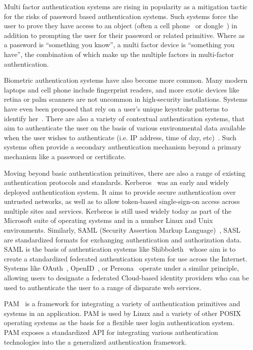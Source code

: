 Multi factor authentication systems are rising in popularity as a
mitigation tactic for the risks of password based authentication
systems. Such systems force the user to prove they have access to an
object (often a cell phone~\cite{google-auth} or
dongle~\cite{yubikey}) in addition to prompting the user for their
password or related primitive. Where as a password is ``something you
know'', a multi factor device is ``something you have'', the
combination of which make up the multiple factors in multi-factor
authentication.

Biometric authentication systems have also become more common. Many
modern laptops and cell phone include fingerprint readers, and more
exotic devices like retina or palm scanners are not uncommon in
high-security installations. Systems have even been proposed that rely
on a user's unique keystroke patterns to identify
her~\cite{Peacock2004}. There are also a variety of contextual
authentication systems, that aim to authenticate the user on the basis
of various environmental data available when the user wishes to
authenticate (i.e. IP address, time of day,
etc)~\cite{Hulsebosch2005}. Such systems often provide a secondary
authentication mechanism beyond a primary mechanism like a password or
certificate.

Moving beyond basic authentication primitives, there are also a range
of existing authentication protocols and
standards. Kerberos~\cite{Kohl1994, Neuman1994} was an early and
widely deployed authentication system. It aims to provide secure
authentication over untrusted networks, as well as to allow
token-based single-sign-on access across multiple sites and
services. Kerberos is still used widely today as part of the Microsoft
suite of operating systems and in a number Linux and Unix
environments. Similarly, SAML (Security Assertion Markup
Language)~\cite{saml}, SASL~\cite{sasl} are standardized formats for
exchanging authentication and authorization data. SAML is the basis of
authentication systems like Shibboleth~\cite{shibboleth, Leandro2012}
whose aim is to create a standardized federated authentication system
for use across the Internet. Systems like OAuth~\cite{oauth},
OpenID~\cite{openid}, or Persona~\cite{persona} operate under a
similar principle, allowing users to designate a federated Cloud-based
identity providers who can be used to authenticate the user to a range
of disparate web services.

PAM~\cite{linux-pam, openpam} is a framework for integrating a variety
of authentication primitives and systems in an application. PAM is
used by Linux and a variety of other POSIX operating systems as the
basis for a flexible user login authentication system. PAM exposes a
standardized API for integrating various authentication technologies
into the a generalized authentication framework.


